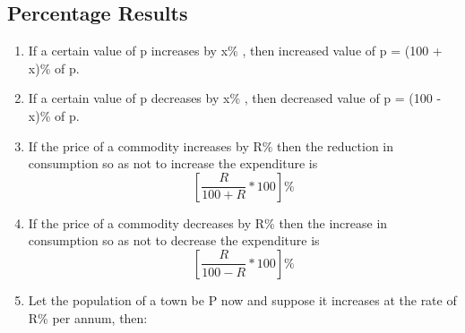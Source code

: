 \subsection{Percentage Results}
\begin{enumerate}
    \item If a certain value of p increases by x\% , then increased value of p = (100 + x)\% of p. \\
    \item If a certain value of p decreases by x\% , then decreased value of p = (100 - x)\% of p. \\
    \item If the price of a commodity increases by R\% then the reduction in consumption so as not to increase the expenditure is 
    \[\left[ \frac{R}{100+R}*100\right]\% \]
    \item If the price of a commodity decreases by R\% then the increase in consumption so as not to decrease the expenditure is 
    \[\left[ \frac{R}{100-R}*100\right]\% \]
    \item Let the population of a town be P now and suppose it increases at the rate of R\% per annum, then:
\end{enumerate}


